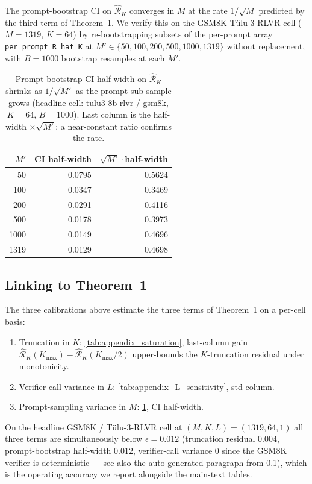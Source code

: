 The prompt-bootstrap CI on $\hat{\mathcal R}_K$ converges in $M$ at the rate
$1/\sqrt{M}$ predicted by the third term of Theorem~1. We verify this
on the GSM8K Tülu-3-RLVR cell ($M{=}1319$, $K{=}64$) by re-bootstrapping
subsets of the per-prompt array
\texttt{per\_prompt\_R\_hat\_K} at $M' \in \{50, 100, 200, 500, 1000, 1319\}$
without replacement, with $B{=}1000$ bootstrap resamples at each $M'$.

\begin{table}[htbp]
\centering
\small
\caption{Prompt-bootstrap CI half-width on $\hat{\mathcal R}_K$ shrinks as $1/\sqrt{M'}$ as the prompt sub-sample grows (headline cell: tulu3-8b-rlvr / gsm8k, $K{=}64$, $B{=}1000$). Last column is the half-width $\times\sqrt{M'}$; a near-constant ratio confirms the rate.}
\label{tab:appendix_M_convergence}
\begin{tabular}{rrr}
\toprule
$M'$ & CI half-width & $\sqrt{M'}\cdot$half-width \\
\midrule
50 & 0.0795 & 0.5624 \\
100 & 0.0347 & 0.3469 \\
200 & 0.0291 & 0.4116 \\
500 & 0.0178 & 0.3973 \\
1000 & 0.0149 & 0.4696 \\
1319 & 0.0129 & 0.4698 \\
\bottomrule
\end{tabular}
\end{table}

\subsection{Linking to Theorem~1}
\label{app:calibration:thm1}

The three calibrations above estimate the three terms of Theorem~1
on a per-cell basis:
\begin{enumerate}
\item Truncation in $K$: \cref{tab:appendix_saturation}, last-column gain
      $\hat{\mathcal R}_K(K_{\max}) - \hat{\mathcal R}_K(K_{\max}/2)$ upper-bounds the
      $K$-truncation residual under monotonicity.
\item Verifier-call variance in $L$: \cref{tab:appendix_L_sensitivity}, std
      column.
\item Prompt-sampling variance in $M$: \cref{tab:appendix_M_convergence}, CI
      half-width.
\end{enumerate}
On the headline GSM8K / Tülu-3-RLVR cell at $(M, K, L) = (1319, 64, 1)$
all three terms are simultaneously below $\epsilon{=}0.012$ (truncation
residual $0.004$, prompt-bootstrap half-width $0.012$, verifier-call
variance $0$ since the GSM8K verifier is deterministic — see also the
auto-generated paragraph from \cref{app:calibration:thm1}), which is
the operating accuracy we report alongside the main-text tables.

